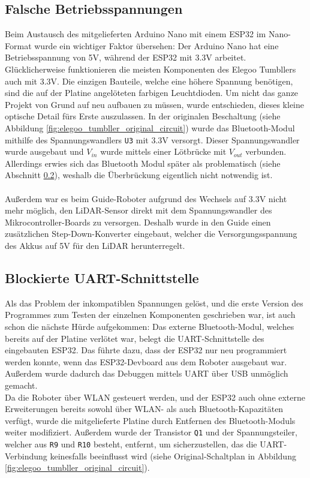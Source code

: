 \subsection{Falsche Betriebsspannungen}
\label{subsec:problem_betriebsspannungen}
Beim Austausch des mitgelieferten Arduino Nano mit einem ESP32 im Nano-Format wurde ein wichtiger Faktor übersehen:
%
Der Arduino Nano hat eine Betriebsspannung von 5V,
während der ESP32 mit 3.3V arbeitet.
%
Glücklicherweise funktionieren die meisten Komponenten des Elegoo Tumbllers auch mit 3.3V.
%
Die einzigen Bauteile,
welche eine höhere Spannung benötigen,
sind die auf der Platine angelöteten farbigen Leuchtdioden.
%
Um nicht das ganze Projekt von Grund auf neu aufbauen zu müssen,
wurde entschieden,
dieses kleine optische Detail fürs Erste auszulassen.
%
In der originalen Beschaltung (siehe Abbildung \ref{fig:elegoo_tumbller_original_circuit})
wurde das Bluetooth-Modul mithilfe des Spannungswandlers \texttt{U3} mit 3.3V versorgt.
%
Dieser Spannungswandler wurde ausgebaut und $V_{in}$ wurde mittels einer Lötbrücke mit $V_{out}$ verbunden.
Allerdings erwies sich das Bluetooth Modul später als problematisch (siehe Abschnitt \ref{subsec:problem_bluetooth_serial}),
weshalb die Überbrückung eigentlich nicht notwendig ist.
\\\\
Außerdem war es beim Guide-Roboter aufgrund des Wechsels auf 3.3V nicht mehr möglich,
den LiDAR-Sensor direkt mit dem Spannungswandler des Mikrocontroller-Boards zu versorgen.
%
Deshalb wurde in den Guide einen zusätzlichen Step-Down-Konverter eingebaut,
welcher die Versorgungsspannung des Akkus auf 5V für den LiDAR herunterregelt.
\subsection{Blockierte UART-Schnittstelle}
\label{subsec:problem_bluetooth_serial}
Als das Problem der inkompatiblen Spannungen gelöst,
und die erste Version des Programmes zum Testen der einzelnen Komponenten geschrieben war,
ist auch schon die nächste Hürde aufgekommen:
%
Das externe Bluetooth-Modul,
welches bereits auf der Platine verlötet war,
belegt die UART-Schnittstelle des eingebauten ESP32.
%
Das führte dazu, dass der ESP32 nur neu programmiert werden konnte,
wenn das ESP32-Devboard aus dem Roboter ausgebaut war.
%
Außerdem wurde dadurch das Debuggen mittels UART über USB unmöglich gemacht.
\\
Da die Roboter über WLAN gesteuert werden,
und der ESP32 auch ohne externe Erweiterungen bereits sowohl über WLAN- als auch Bluetooth-Kapazitäten verfügt,
wurde die mitgelieferte Platine durch Entfernen des Bluetooth-Moduls weiter modifiziert.
%
Außerdem wurde der Transistor \texttt{Q1} und der Spannungsteiler,
welcher aus \texttt{R9} und \texttt{R10} besteht,
entfernt, um sicherzustellen,
das die UART-Verbindung keinesfalls beeinflusst wird
(siehe Original-Schaltplan in Abbildung \ref{fig:elegoo_tumbller_original_circuit}).


